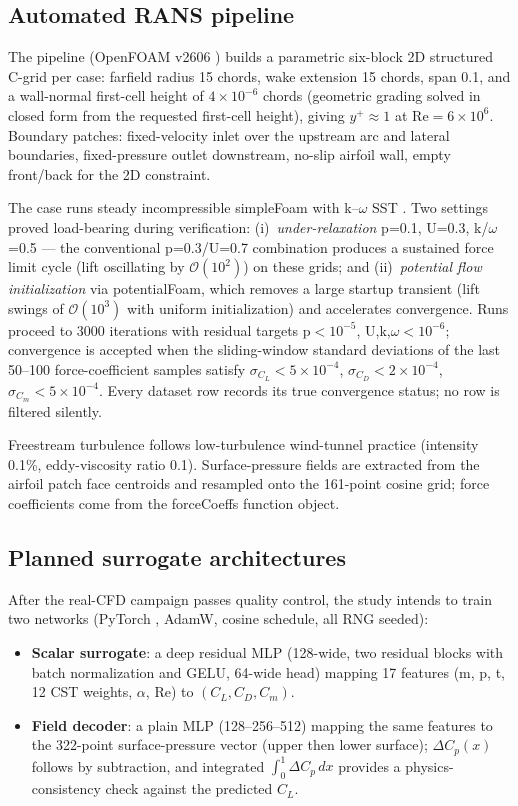 \documentclass[11pt]{article}
\begin{document}
\subsection{Automated RANS pipeline}
The pipeline (OpenFOAM v2606 \citep{weller1998}) builds a parametric six-block
2D structured C-grid per case: farfield radius 15 chords, wake extension 15
chords, span 0.1, and a wall-normal first-cell height of
$4\times10^{-6}$ chords (geometric grading solved in closed form from the
requested first-cell height), giving $y^+\approx1$ at
$\mathrm{Re}=6\times10^6$. Boundary patches: fixed-velocity inlet over the
upstream arc and lateral boundaries, fixed-pressure outlet downstream,
no-slip airfoil wall, empty front/back for the 2D constraint.

The case runs steady incompressible simpleFoam with k--$\omega$ SST
\citep{menter1994}. Two settings proved load-bearing during verification:
(i)~\emph{under-relaxation} p=0.1, U=0.3, k/$\omega$=0.5 --- the conventional
p=0.3/U=0.7 combination produces a sustained force limit cycle (lift
oscillating by $\mathcal{O}(10^2)$) on these grids; and (ii)~\emph{potential
flow initialization} via potentialFoam, which removes a large startup
transient (lift swings of $\mathcal{O}(10^3)$ with uniform initialization) and
accelerates convergence. Runs proceed to 3000 iterations with residual targets
p$<10^{-5}$, U,k,$\omega$$<10^{-6}$; convergence is accepted when the
sliding-window standard deviations of the last 50--100 force-coefficient
samples satisfy $\sigma_{C_L}<5\times10^{-4}$,
$\sigma_{C_D}<2\times10^{-4}$, $\sigma_{C_m}<5\times10^{-4}$. Every dataset
row records its true convergence status; no row is filtered silently.

Freestream turbulence follows low-turbulence wind-tunnel practice
(intensity 0.1\%, eddy-viscosity ratio 0.1). Surface-pressure fields are
extracted from the airfoil patch face centroids and resampled onto the 161-point
cosine grid; force coefficients come from the forceCoeffs function object.

\subsection{Planned surrogate architectures}
After the real-CFD campaign passes quality control, the study intends to train
two networks (PyTorch \citep{paszke2019}, AdamW, cosine schedule, all RNG seeded):
\begin{itemize}
  \item \textbf{Scalar surrogate}: a deep residual MLP (128-wide, two residual
  blocks with batch normalization and GELU, 64-wide head) mapping 17 features
  (m, p, t, 12 CST weights, $\alpha$, Re) to $(C_L, C_D, C_m)$.
  \item \textbf{Field decoder}: a plain MLP (128--256--512) mapping the same
  features to the 322-point surface-pressure vector (upper then lower
  surface); $\Delta C_p(x)$ follows by subtraction, and integrated
  $\int_0^1 \Delta C_p\,dx$ provides a physics-consistency check against the
  predicted $C_L$.
\end{itemize}
\end{document}
